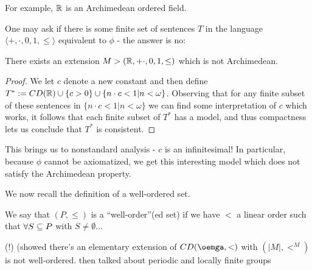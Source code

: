For example, $\mathbb{R}$ is an Archimedean ordered field.

One may ask if there is some finite set of sentences $T$ in the language $\langle +, \cdot, 0, 1, \leq\rangle$ equivalent to $\phi$ - the answer is no:

\begin{boxtheorem}
    There exists an extension $M>(\mathbb{R}, + \cdot, 0, 1, \leq)$ which is not Archimedean.
\end{boxtheorem}
\begin{proof}
    We let $c$ denote a new constant and then define $T^*:=CD(\mathbb{R})\cup \{c>0\}\cup\{n\cdot c<1|n<\omega\}$. Observing that for any finite subset of these sentences in $\{n\cdot c<1|n<\omega\}$ we can find some interpretation of $c$ which works, it follows that each finite subset of $T^*$ has a model, and thus compactness lets us conclude that $T^*$ is consistent.
\end{proof}
\begin{remark}
    This brings us to nonstandard analysis - $c$ is an infinitesimal! In particular, because $\phi$ cannot be axiomatized, we get this interesting model which does not satisfy the Archimedean property.
\end{remark}

We now recall the definition of a well-ordered set.
\begin{boxdefinition}
    We say that $(P, \leq)$ is a ``well-order''(ed set) if we have $<$ a linear order such that $\forall S\subseteq P$ with $S\neq \emptyset$...\sorry
\end{boxdefinition}
\sorry \sorry \sorry (!) (showed there's an elementary extension of $CD(\oemga, <)$ with $(|M|, <^M)$ is not well-ordered. then talked about periodic and locally finite groups